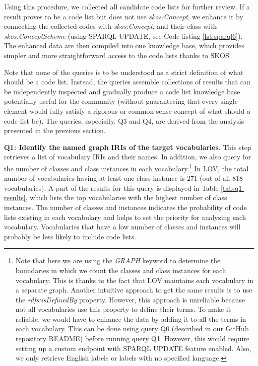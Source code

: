Using this procedure, we collected all candidate code lists for further review. If a result proves to be a code list but does not use \emph{skos:Concept}, we enhance it by connecting the collected codes with \emph{skos:Concept}, and their class with \emph{skos:ConceptScheme} (using SPARQL UPDATE, see Code listing \ref{lst:sparql6}). The enhanced data are then compiled into one knowledge base, which provides simpler and more straightforward access to the code lists thanks to SKOS.



Note that none of the queries is to be understood as a strict definition of what should be a code list.
Instead, the queries assemble collections of results that can be independently inspected and gradually produce a code list knowledge base potentially useful for the community (without guaranteeing that every single element would fully satisfy a rigorous or common-sense concept of what should a code list be).
The queries, especially, Q3 and Q4, are derived from the analysis presented in the previous section. 

\medskip
\medskip
\noindent\textbf{Q1: Identify the named graph IRIs of the target vocabularies}. This step retrieves a list of vocabulary IRIs and their names. In addition, we also query for the number of classes and class instances in each vocabulary.\footnote{Note that here we are using the \textit{GRAPH} keyword to determine the boundaries in which we count the classes and class instances for each vocabulary. This is thanks to the fact that LOV maintains each vocabulary in a separate graph. Another intuitive approach to get the same results is to use the \textit{rdfs:isDefinedBy} property. However, this approach is unreliable because not all vocabularies use this property to define their terms. To make it reliable, we would have to enhance the data by adding it to all the terms in each vocabulary. This can be done using
query Q0 (described in our GitHub repository README) before running query Q1. However, this would require setting up a custom endpoint with SPARQL UPDATE feature enabled. Also, we only retrieve English labels or labels with no specified language.} In LOV, the total number of vocabularies having at least one class instance is 271 (out of all 818 vocabularies). A part of the results for this query is displayed in Table \ref{tab:q1-results}, which lists the top vocabularies with the highest number of class instances. The number of classes and instances indicates the probability of code lists existing in each vocabulary and helps to set the priority for analyzing each vocabulary. Vocabularies that have a low number of classes and instances will probably be less likely to include code lists. %

